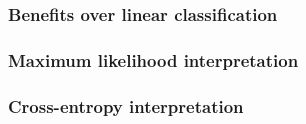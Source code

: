     \begin{example}
        
    \end{example}

    \subsubsection{Benefits over linear classification}

    \subsubsection{Maximum likelihood interpretation}

    \subsubsection{Cross-entropy interpretation}

    